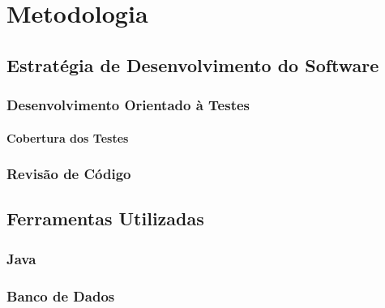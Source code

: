 
\chapter{Metodologia}

\section{Estratégia de Desenvolvimento do Software}

\subsection{Desenvolvimento Orientado à Testes}

\subsubsection{Cobertura dos Testes}

\subsection{Revisão de Código}

\section{Ferramentas Utilizadas}

\subsection{Java}

\subsection{Banco de Dados}




